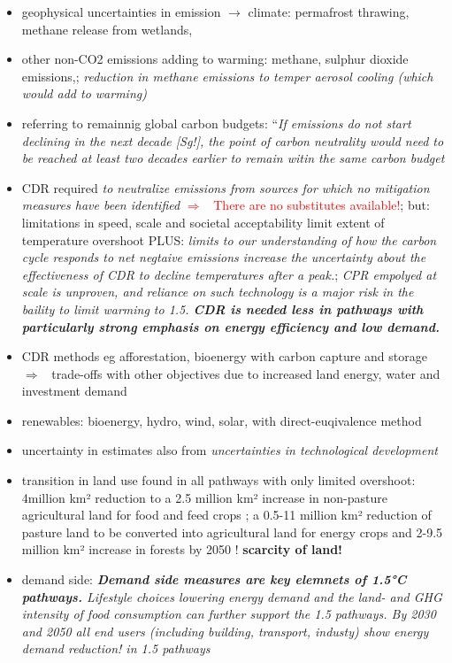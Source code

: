 \documentclass[12pt]{article}
\newcommand{\ar}{$\Rightarrow$ \ }
\newcommand{\tr}[1]{\textcolor{red}{#1}}
\begin{document}
\begin{itemize}
\item geophysical uncertainties in emission $\rightarrow$ climate: permafrost thrawing, methane release from wetlands, 
\item other non-CO2 emissions adding to warming:
methane, sulphur dioxide emissions,; \textit{reduction in methane emissions to temper aerosol cooling (which would add to warming)}
\item referring to remainnig global carbon budgets: ``\textit{If emissions do not start declining in the next decade [Sg!], the point of carbon neutrality would need to be reached at least two decades earlier to remain witin the same carbon budget}
\item CDR required \textit{to neutralize emissions from sources for which no mitigation measures have been identified} \tr{\ar There are no substitutes available!}; but: limitations in speed, scale and societal acceptability limit extent of temperature overshoot PLUS: \textit{limits to our understanding of how the carbon cycle responds to net negtaive emissions increase the uncertainty about the effectiveness of CDR to decline temperatures after a peak.}; \textit{CPR empolyed at scale is unproven, and reliance on such technology is a major risk in the baility to limit  warming to 1.5. \textbf{CDR is needed less in pathways with particularly strong emphasis on energy efficiency and low demand.}} 
\item CDR methods eg afforestation, bioenergy with carbon capture and storage
\ar trade-offs with other objectives due to increased land energy, water and investment demand
\item renewables: bioenergy, hydro, wind, solar, with direct-euqivalence method
\item uncertainty in estimates also from \textit{uncertainties in technological development}
\item transition in land use found in all pathways with only limited overshoot:  4million km² reduction to a 2.5 million km² increase in non-pasture agricultural land for food and feed crops ; a 0.5-11 million km² reduction of pasture land to be converted into agricultural land for energy crops and 2-9.5 million km² increase in forests by 2050 ! \textbf{scarcity of land!}
\item demand side: \textit{\textbf{Demand side measures are key elemnets of 1.5°C pathways.} Lifestyle choices lowering energy demand and the land- and GHG intensity of food consumption can further support the 1.5 pathways. By 2030 and 2050 all end users (including building, transport, industy) show energy demand reduction! in 1.5 pathways }
\end{itemize}
\end{document}
